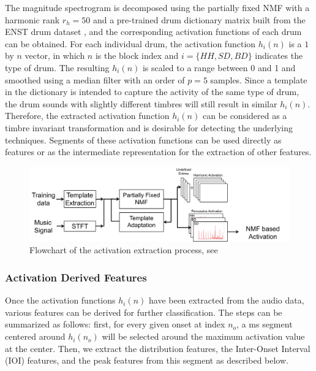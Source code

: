 \documentclass{article}
\begin{document}
{{{{{{{{\color{red}{Since the reader does not know the algorithm in the first place, it doesn't make sense to give the detailed parametrization. You need a short overview of how the method works and then you can give the parametrization. But I don't think it has to be this lengthy...} The magnitude spectrogram is decomposed using the partially fixed NMF with a harmonic rank $r_{h} = 50$ and a pre-trained drum dictionary matrix built from the ENST drum dataset \cite{Gillet2006}, and the corresponding activation functions of each drum can be obtained. For each individual drum, the activation function $h_{i}(n)$ is a $1$ by $n$ vector, in which $n$ is the block index and $i = \{HH, SD, BD\}$ indicates the type of drum. The resulting $h_{i}(n)$ is scaled to a range between 0 and 1 and smoothed using a median filter with an order of $p = 5$ samples. Since a template in the dictionary is intended to capture the activity of the same type of drum, the drum sounds with slightly different timbres will still result in similar $h_{i}(n)$. Therefore, the extracted activation function $h_{i}(n)$ can be considered as a timbre invariant transformation and is desirable for detecting the underlying techniques. Segments of these activation functions can be used directly as features or as the intermediate representation for the extraction of other features. 

\begin{figure}
\centering
\includegraphics[width = 8.5 cm]{./figures/nmf.png}
\caption{Flowchart of the activation extraction process, see \cite{Wu2015a}}
\label{fig:nmf}
\end{figure}

\subsubsection{Activation Derived Features}
\label{sssec:activ features}
Once the activation functions $h_{i}(n)$ have been extracted from the audio data, various features can be derived for further classification. The steps can be summarized as follows: first, for every given onset at index $n_{o}$, a \unit[400]{ms} segment centered around $h_{i}(n_{o})$ will be selected around the maximum activation value at the center. Then, we extract the distribution features, the Inter-Onset Interval (IOI) features, and the peak features from this segment as described below. 

}}}}}}}}
\end{document}
